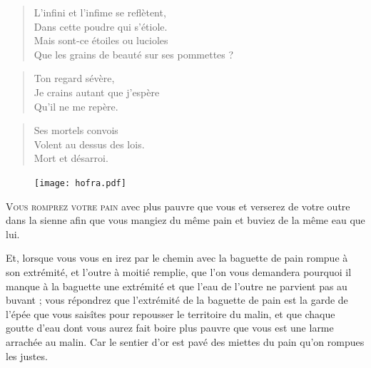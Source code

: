 \begin{verse}
  L’infini et l’infime se reflètent,\\  %
  Dans cette poudre qui s’étiole.\\  %
  Mais sont-ce étoiles ou lucioles\\  %
  Que les grains de beauté sur ses pommettes ?
\end{verse}

\begin{verse}\haiku
  Ton regard sévère,\\  %
  Je crains autant que j’espère\\  %
  Qu’il ne me repère.
\end{verse}


\begin{verse}\haiku
  Ses mortels convois\\
  Volent au dessus des lois.\\
  Mort et désarroi.
\end{verse}

\begin{figure}[h]
  \centering
  \texttt{[image: hofra.pdf]}
  \captionsetup{labelformat=empty}
  \caption[Idéotexte du  (\textarabic{حفره})]{}
\end{figure}

\lettrine[lines=3,slope=-.7em]{V}{ous romprez votre pain} avec plus pauvre que vous et verserez de votre outre dans la sienne afin que vous mangiez du même pain et buviez de la même eau que lui.

Et, lorsque vous vous en irez par le chemin avec la baguette de pain rompue à son extrémité, et l’outre à moitié remplie, que l’on vous demandera pourquoi il manque à la baguette une extrémité et que l’eau de l’outre ne parvient pas au buvant ; vous répondrez que l’extrémité de la baguette de pain est la garde de l’épée que vous saisîtes pour repousser le territoire du malin, et que chaque goutte d’eau dont vous aurez fait boire plus pauvre que vous est une larme arrachée au malin.
Car le sentier d’or est pavé des miettes du pain qu’on rompues les justes.

